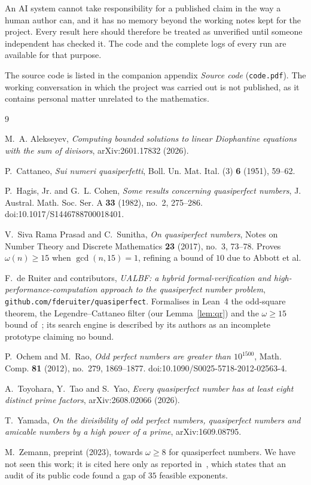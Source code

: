 \documentclass[11pt]{amsart}
\theoremstyle{remark}
\begin{document}
An AI system cannot take responsibility for a published claim in the way a
human author can, and it has no memory beyond the working notes kept for the
project. Every result here should therefore be treated as unverified until
someone independent has checked it. The code and the complete logs of every
run are available for that purpose.

The source code is listed in the companion appendix \emph{Source code}
(\texttt{code.pdf}). The working conversation in which the project was
carried out is not published, as it contains personal matter unrelated
to the mathematics.

\begin{thebibliography}{9}

M.~A. Alekseyev, \emph{Computing bounded solutions to linear Diophantine
equations with the sum of divisors}, arXiv:2601.17832 (2026).

P.~Cattaneo, \emph{Sui numeri quasiperfetti}, Boll. Un. Mat. Ital. (3)
\textbf{6} (1951), 59--62.

P.~Hagis, Jr. and G.~L. Cohen, \emph{Some results concerning quasiperfect
numbers}, J. Austral. Math. Soc. Ser. A \textbf{33} (1982), no.~2, 275--286.
doi:10.1017/S1446788700018401.

V.~Siva Rama Prasad and C.~Sunitha, \emph{On quasiperfect numbers}, Notes on
Number Theory and Discrete Mathematics \textbf{23} (2017), no.~3, 73--78.
Proves $\omega(n) \ge 15$ when $\gcd(n,15) = 1$, refining a bound of $10$ due to
Abbott et al.

F.~de Ruiter and contributors, \emph{UALBF: a hybrid formal-verification and
high-performance-computation approach to the quasiperfect number problem},
\texttt{github.com/fderuiter/quasiperfect}. Formalises in Lean~4 the
odd-square theorem, the Legendre--Cattaneo filter (our Lemma~\ref{lem:qr}) and
the $\omega \ge 15$ bound of~\cite{prasad}; its search engine is described by its
authors as an incomplete prototype claiming no bound.

P.~Ochem and M.~Rao, \emph{Odd perfect numbers are greater than $10^{1500}$},
Math. Comp. \textbf{81} (2012), no.~279, 1869--1877.
doi:10.1090/S0025-5718-2012-02563-4.

A.~Toyohara, Y.~Tao and S.~Yao, \emph{Every quasiperfect number has at least
eight distinct prime factors}, arXiv:2608.02066 (2026).

T.~Yamada, \emph{On the divisibility of odd perfect numbers, quasiperfect
numbers and amicable numbers by a high power of a prime}, arXiv:1609.08795.

M.~Zemann, preprint (2023), towards $\omega \ge 8$ for quasiperfect numbers. We
have not seen this work; it is cited here only as reported in~\cite{tty},
which states that an audit of its public code found a gap of $35$ feasible
exponents.

\end{thebibliography}
\end{document}
